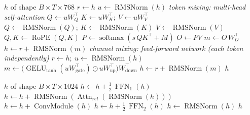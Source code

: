 \documentclass[10pt,a4paper]{article}
\newcommand{\op}[1]{\operatorname{#1}}
\theoremstyle{definition}
\begin{document}
\begin{algorithm}[H]
\caption{Block $\mathcal{B}_{\mathrm{V}}(h)$ --- Vision encoder block}
\begin{algorithmic}[1]
\Require $h$ of shape $B\times T\times 768$
\State $r \gets h$ 
\State $u \gets \op{RMSNorm}(h)$ 
\Statex \hspace{-1.2em}\textit{token mixing: multi-head self-attention}
\State $Q \gets u W_Q^{\top}$ 
\State $K \gets u W_K^{\top};\ V \gets u W_V^{\top}$ 
\State $Q \gets \op{RMSNorm}(Q);\ K \gets \op{RMSNorm}(K)$ 
\State $V \gets \op{RMSNorm}(V)$
\State $Q, K \gets \op{RoPE}(Q, K)$ 
\State $P \gets \op{softmax}(s\, Q K^{\top} + M)$ 
\State $O \gets P V$ 
\State $m \gets O\, W_O^{\top}$ 
\State $h \gets r + \op{RMSNorm}(m)$ 
\Statex \hspace{-1.2em}\textit{channel mixing: feed-forward network (each token independently)}
\State $r \gets h;\ u \gets \op{RMSNorm}(h)$
\State $m \gets \big(\op{GELU}_{\tanh}(u W_{\mathrm{gate}}^{\top}) \odot u W_{\mathrm{up}}^{\top}\big) W_{\mathrm{down}}^{\top}$ 
\State $h \gets r + \op{RMSNorm}(m)$ 
\State \Return $h$
\end{algorithmic}
\end{algorithm}
\begin{algorithm}[H]
\caption{Block $\mathcal{B}_{\mathrm{A}}(h)$ --- Conformer audio block}
\begin{algorithmic}[1]
\Require $h$ of shape $B\times T\times 1024$
\State $h \gets h + \tfrac12\,\op{FFN}_1(h)$ 
\State $h \gets h + \op{RMSNorm}(\op{Attn}_{rel}(\op{RMSNorm}(h)))$ 
\State $h \gets h + \op{ConvModule}(h)$ 
\State $h \gets h + \tfrac12\,\op{FFN}_2(h)$ 
\State $h \gets \op{RMSNorm}(h)$
\State \Return $h$
\end{algorithmic}
\end{algorithm}
\end{document}
